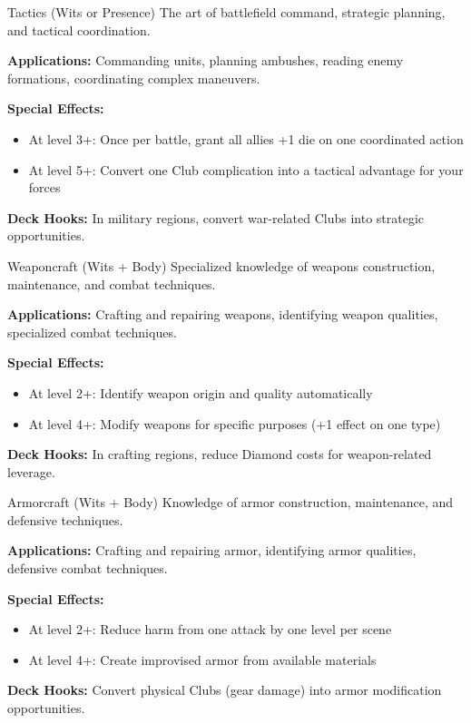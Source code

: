\begin{skillbox}{Tactics (Wits or Presence)}
The art of battlefield command, strategic planning, and tactical coordination.

\textbf{Applications:} Commanding units, planning ambushes, reading enemy formations, coordinating complex maneuvers.

\textbf{Special Effects:} 
\begin{itemize}
    \item At level 3+: Once per battle, grant all allies +1 die on one coordinated action
    \item At level 5+: Convert one Club complication into a tactical advantage for your forces
\end{itemize}

\textbf{Deck Hooks:} In military regions, convert war-related Clubs into strategic opportunities.
\end{skillbox}

\begin{skillbox}{Weaponcraft (Wits + Body)}
Specialized knowledge of weapons construction, maintenance, and combat techniques.

\textbf{Applications:} Crafting and repairing weapons, identifying weapon qualities, specialized combat techniques.

\textbf{Special Effects:}
\begin{itemize}
    \item At level 2+: Identify weapon origin and quality automatically
    \item At level 4+: Modify weapons for specific purposes (+1 effect on one type)
\end{itemize}

\textbf{Deck Hooks:} In crafting regions, reduce Diamond costs for weapon-related leverage.
\end{skillbox}

\begin{skillbox}{Armorcraft (Wits + Body)}
Knowledge of armor construction, maintenance, and defensive techniques.

\textbf{Applications:} Crafting and repairing armor, identifying armor qualities, defensive combat techniques.

\textbf{Special Effects:}
\begin{itemize}
    \item At level 2+: Reduce harm from one attack by one level per scene
    \item At level 4+: Create improvised armor from available materials
\end{itemize}

\textbf{Deck Hooks:} Convert physical Clubs (gear damage) into armor modification opportunities.
\end{skillbox}

